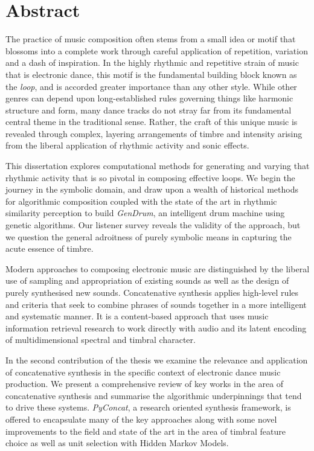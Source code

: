 
\chapter{Abstract}

The practice of music composition often stems from a small idea or motif that blossoms into a complete work through careful application of repetition, variation and a dash of inspiration. In the highly rhythmic and repetitive strain of music that is electronic dance, this motif is the fundamental building block known as the \textit{loop}, and is accorded greater importance than any other style. While other genres can depend upon long-established rules governing things like harmonic structure and form, many dance tracks do not stray far from its fundamental central theme in the traditional sense. Rather, the craft of this unique music is revealed through complex, layering arrangements of timbre and intensity arising from the liberal application of rhythmic activity and sonic effects.

This dissertation explores computational methods for generating and varying that rhythmic activity that is so pivotal in composing effective loops. We begin the journey in the symbolic domain, and draw upon a wealth of historical methods for algorithmic composition coupled with the state of the art in rhythmic similarity perception to build \textit{GenDrum}, an intelligent drum machine using genetic algorithms. Our listener survey reveals the validity of the approach, but we question the general adroitness of purely symbolic means in capturing the acute essence of timbre.

Modern approaches to composing electronic music are distinguished by the liberal use of sampling and appropriation of existing sounds as well as the design of purely synthesised new sounds. Concatenative synthesis applies high-level rules and criteria that seek to combine phrases of sounds together in a more intelligent and systematic manner. It is a content-based approach that uses music information retrieval research to work directly with audio and its latent encoding of multidimensional spectral and timbral character.

In the second contribution of the thesis we examine the relevance and application of concatenative synthesis in the specific context of electronic dance music production. We present a comprehensive review of key works in the area of concatenative synthesis and summarise the algorithmic underpinnings that tend to drive these systems. \textit{PyConcat}, a research oriented synthesis framework, is offered to encapsulate many of the key approaches along with some novel improvements to the field and state of the art in the area of timbral feature choice as well as unit selection with Hidden Markov Models. 

